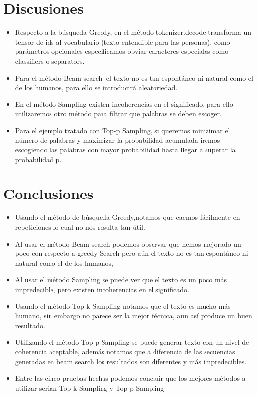 \documentclass[10pt,twocolumn]{article}
\theoremstyle{definition}
\begin{document}
\section{Discusiones}
\begin{itemize}
    \item Respecto a la búsqueda Greedy, en el método tokenizer.decode transforma un tensor de ids al vocabulario (texto entendible para las personas), como parámetros opcionales especificamos obviar caracteres especiales como classifiers o separators.
    \item Para el método Beam search, el texto no es tan espontáneo ni natural como el de los humanos, para ello se introducirá aleatoriedad.
    \item En el método Sampling existen incoherencias en el significado, para ello utilizaremos otro método para filtrar que palabras se deben escoger.  
    \item Para el ejemplo tratado con Top-p Sampling, si queremos minizimar el número de palabras y maximizar la probabilidad acumulada iremos escogiendo las palabras con mayor probabilidad hasta llegar a superar la probabilidad p.
    
\end{itemize}

\section{Conclusiones}
\begin{itemize}
    \item Usando el método de búsqueda Greedy,notamos que caemos fácilmente en repeticiones lo cual no nos resulta tan útil.
    \item Al usar el método Beam search podemos observar que hemos mejorado un poco con respecto a greedy Search pero aún el texto no es tan espontáneo ni natural como el de los humanos, 
    \item Al usar el método Sampling se puede ver que el texto es un poco más impredecible, pero existen incoherencias en el significado.
    \item Usando el método Top-k Sampling notamos que el texto es mucho más humano, sin embargo no parece ser la mejor técnica, aun así produce un buen resultado.
    \item Utilizando el método Top-p Sampling se puede generar texto con un nivel de coherencia aceptable, además notamos que a diferencia de las secuencias generadas en beam search los resultados son diferentes y más impredecibles.
    \item Entre las cinco pruebas hechas podemos concluir que los mejores métodos a utilizar serian Top-k Sampling y Top-p Sampling

\end{itemize}
\end{document}
